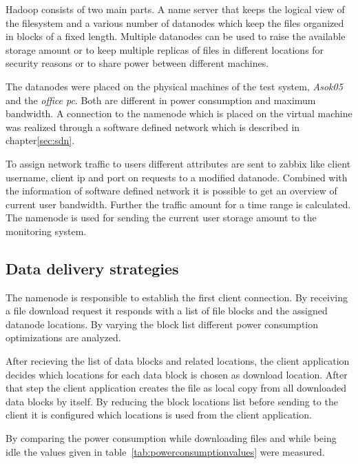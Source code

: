 Hadoop consists of two main parts. A name server that keeps the logical view of the filesystem and a various number of datanodes which keep the files organized in blocks of a fixed length. Multiple datanodes can be used to raise the available storage amount or to keep multiple replicas of files in different locations for security reasons or to share power between different machines. 

The datanodes were placed on the physical machines of the test system, \textit{Asok05} and the \textit{office pc}. Both are different in power consumption and maximum bandwidth. A connection to the namenode which is placed on the virtual machine was realized through a software defined network which is described in chapter\ref{sec:sdn}.

To assign network traffic to users different attributes are sent to zabbix like client username, client ip and port on requests to a modified datanode. Combined with the information of software defined network it is possible to get an overview of current user bandwidth. Further the traffic amount for a time range is calculated. The namenode is used for sending the current user storage amount to the monitoring system.

\subsection{Data delivery strategies}

The namenode is responsible to establish the first client connection. By receiving a file download request it responds with a list of file blocks and the assigned datanode locations. By varying the block list different power consumption optimizations are analyzed.

After recieving the list of data blocks and related locations, the client application decides which locations for each data block is chosen as download location. After that step the client application creates the file as local copy from all downloaded data blocks by itself. By reducing the block locations list before sending to the client it is configured which locations is used from the client application.

By comparing the power consumption while downloading files and while being idle the values given in table~\ref{tab:powerconsumptionvalues} were measured.


